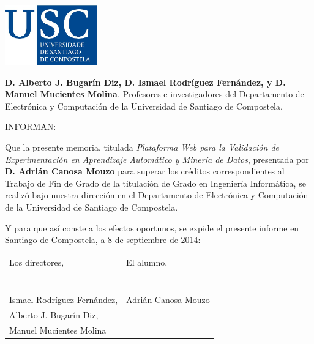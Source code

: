 \pagestyle{plain}
\includegraphics[width=4cm]{figuras/logo_usc.jpg}

\vspace{1cm}
{\bf D. Alberto J. Bugarín Diz, D. Ismael Rodríguez Fernández, y D. Manuel Mucientes Molina}, Profesores e investigadores del Departamento de Electrónica y Computación de la Universidad de Santiago de Compostela,

\vspace{1cm}
INFORMAN:

\vspace{1cm}
Que la presente memoria, titulada {\it Plataforma Web para la Validación de Experimentación en Aprendizaje Automático y Minería de Datos}, presentada por {\bf D. Adrián Canosa Mouzo} para superar los créditos correspondientes al Trabajo de Fin de Grado de la titulación de Grado en Ingeniería Informática, se realizó bajo nuestra dirección en el Departamento de Electrónica y Computación de la Universidad de Santiago de Compostela.

\vspace{1cm}
Y para que así conste a los efectos oportunos, se expide el presente informe en Santiago de Compostela, a 8 de septiembre de 2014:

\vspace{2cm}
\begin{tabular}{p{}p{}}
Los directores, & El alumno, \\
& \\
& \\
& \\
& \\
& \\
& \\
& \\
Ismael Rodríguez Fernández, & Adrián Canosa Mouzo \\
Alberto J. Bugarín Diz, & \\
Manuel Mucientes Molina
\end{tabular}